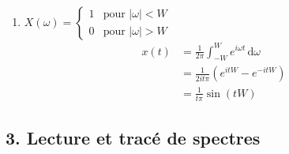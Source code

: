 \begin{solution}
\begin{enumerate}[label=(\alph*)]
        \item 
        $
        X(\omega) = 
        \begin{cases}
            1 & \text{pour } |\omega| < W \\
            0 & \text{pour } |\omega| > W
        \end{cases}
        $
        \[
        \begin{aligned}
            x(t) &= \frac{1}{2\pi} \int_{-W}^{W} e^{i\omega t} \, \mathrm{d}\omega \\
                 &= \frac{1}{2it\pi} \left( e^{it W} - e^{-it W} \right) \\
                 &= \frac{1}{t\pi} \sin(t W)
        \end{aligned}
        \]
    
    \end{enumerate}
\end{solution}

\subsection*{3. Lecture et tracé de spectres}

